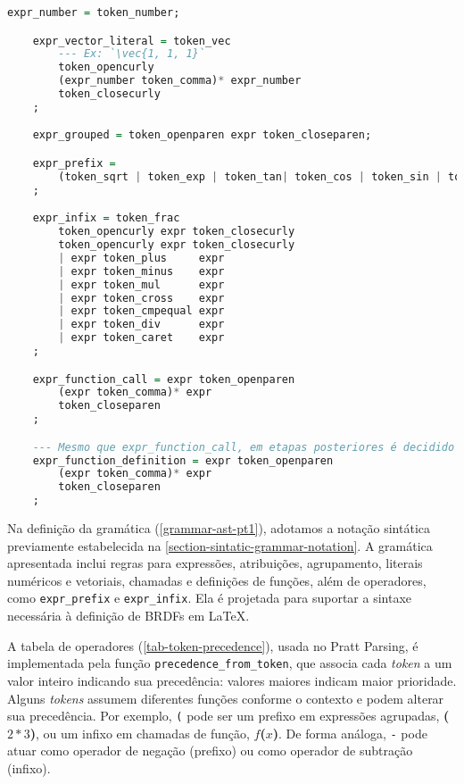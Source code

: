 \begin{codigo}[H]
        \caption{\small Gramática para \texttt{EquantionLang} parte 2.}
        \label{grammar-ast-pt2}
\begin{lstlisting}[language=haskell, basicstyle=\ttfamily\footnotesize,numbers=none, inputencoding=utf8]
    expr_number = token_number;

    expr_vector_literal = token_vec
        --- Ex: `\vec{1, 1, 1}`
        token_opencurly
        (expr_number token_comma)* expr_number
        token_closecurly
    ;

    expr_grouped = token_openparen expr token_closeparen;

    expr_prefix =
        (token_sqrt | token_exp | token_tan| token_cos | token_sin | token_arctan | token_arccos | token_arcsin | token_minus | token_plus) expr
    ;

    expr_infix = token_frac
        token_opencurly expr token_closecurly
        token_opencurly expr token_closecurly
        | expr token_plus     expr
        | expr token_minus    expr
        | expr token_mul      expr
        | expr token_cross    expr
        | expr token_cmpequal expr
        | expr token_div      expr
        | expr token_caret    expr
    ;

    expr_function_call = expr token_openparen
        (expr token_comma)* expr
        token_closeparen
    ;

    --- Mesmo que expr_function_call, em etapas posteriores é decidido qual tipo realmente é.
    expr_function_definition = expr token_openparen
        (expr token_comma)* expr
        token_closeparen
    ;
\end{lstlisting}
\end{codigo}

Na definição da gramática (\autoref{grammar-ast-pt1}), adotamos a notação sintática previamente estabelecida na \autoref{section-sintatic-grammar-notation}. 
A gramática apresentada inclui regras para expressões, atribuições, agrupamento, literais numéricos e vetoriais, chamadas e definições de funções, além de operadores, como \verb"expr_prefix" e \verb"expr_infix". Ela é projetada para suportar a sintaxe necessária à definição de BRDFs em \LaTeX{}.



A tabela de operadores (\autoref{tab-token-precedence}), usada no Pratt Parsing, é implementada pela função \texttt{precedence\_from\_token}, que associa cada \textit{token} a um valor inteiro indicando sua precedência: valores maiores indicam maior prioridade. Alguns \textit{tokens} assumem diferentes funções conforme o contexto e podem alterar sua precedência. Por exemplo, \texttt{(} pode ser um prefixo em expressões agrupadas, \textbf{(}$2*3$\textbf{)}, ou um infixo em chamadas de função, $f$\textbf{(}$x$\textbf{)}. De forma análoga, \texttt{-} pode atuar como operador de negação (prefixo) ou como operador de subtração (infixo). 


